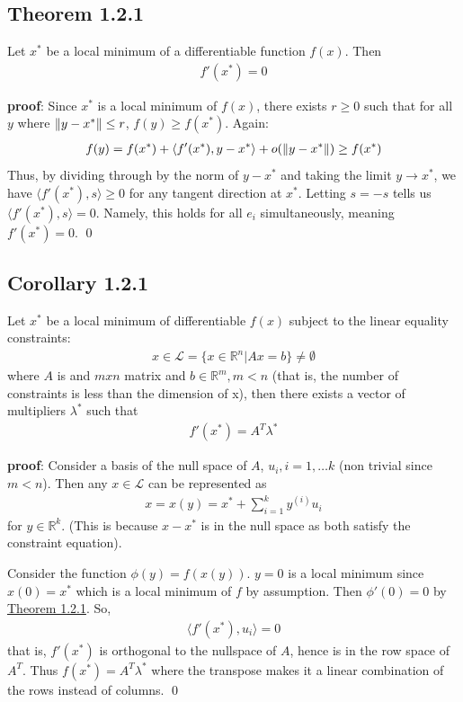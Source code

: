 \documentclass[12pt,a4paper]{article}
\begin{document}
	\subsection*{Theorem 1.2.1}\label{thm121}
	Let $x^*$ be a local minimum of a differentiable function $f(x)$. Then 
	\begin{align*}
		f'(x^*) = 0
	\end{align*}
	
	\textbf{proof}: Since $x^*$ is a local minimum of $f(x)$, there exists $r \geq 0$ such that for all $y$ where $\norm{y-x^*} \leq r$, $f(y) \geq f(x^*)$. Again:
	\begin{align*}
		f(y) = f(x^*) + \langle f'(x^*), y - x^* \rangle + o(\norm{y-x^*}) \geq f(x^*)
	\end{align*}
	Thus, by dividing through by the norm of $y - x^*$ and taking the limit $y \rightarrow x^*$, we have $\langle f'(x^*), s \rangle \geq 0$ for any tangent direction at $x^*$. Letting $s = -s$ tells us $\langle f'(x^*), s \rangle = 0$. Namely, this holds for all $e_i$ simultaneously, meaning $f'(x^*) = 0$. \qed
	
	\subsection*{Corollary 1.2.1}\label{cor121}
	Let $x^*$ be a local minimum of differentiable $f(x)$ subject to the linear equality constraints:
	\begin{align*}
		x \in \mathcal{L} = \{x \in \mathbb{R}^n | Ax = b \} \neq \emptyset
	\end{align*}
	where $A$ is and $mxn$ matrix and $b \in \mathbb{R}^m, m<n$ (that is, the number of constraints is less than the dimension of x), then there exists a vector of multipliers $\lambda^*$ such that
	\begin{align*}
		f'(x^*) = A^T\lambda^*
	\end{align*}
	
	\textbf{proof}: Consider a basis of the null space of $A$, $u_i, i=1, \ldots k$ (non trivial since $m < n$). Then any $x \in \mathcal{L}$ can be represented as
	\begin{align*}
		x = x(y) = x^* + \sum_{i=1}^{k}y^{(i)}u_i
	\end{align*}
	for $y \in \mathbb{R}^k$. (This is because $x - x^*$ is in the null space as both satisfy the constraint equation). 
	
	Consider the function $\phi(y) = f(x(y))$. $y = 0$ is a local minimum since $x(0) = x^*$ which is a local minimum of $f$ by assumption. Then $\phi ' (0) = 0$ by \hyperref[thm121]{Theorem 1.2.1}. So,
	\begin{align*}
		\langle f'(x^*), u_i \rangle = 0
	\end{align*}
	that is, $f'(x^*)$ is orthogonal to the nullspace of $A$, hence is in the row space of $A^T$. Thus $f(x^*) = A^T\lambda^*$ where the transpose makes it a linear combination of the rows instead of columns. \qed
	
\end{document}
